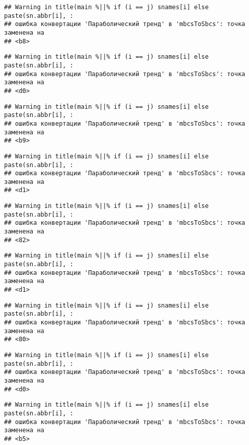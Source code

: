 \documentclass[
]{article}
\begin{document}
\begin{verbatim}
## Warning in title(main %||% if (i == j) snames[i] else paste(sn.abbr[i], :
## ошибка конвертации 'Параболический тренд' в 'mbcsToSbcs': точка заменена на
## <b8>
\end{verbatim}

\begin{verbatim}
## Warning in title(main %||% if (i == j) snames[i] else paste(sn.abbr[i], :
## ошибка конвертации 'Параболический тренд' в 'mbcsToSbcs': точка заменена на
## <d0>
\end{verbatim}

\begin{verbatim}
## Warning in title(main %||% if (i == j) snames[i] else paste(sn.abbr[i], :
## ошибка конвертации 'Параболический тренд' в 'mbcsToSbcs': точка заменена на
## <b9>
\end{verbatim}

\begin{verbatim}
## Warning in title(main %||% if (i == j) snames[i] else paste(sn.abbr[i], :
## ошибка конвертации 'Параболический тренд' в 'mbcsToSbcs': точка заменена на
## <d1>
\end{verbatim}

\begin{verbatim}
## Warning in title(main %||% if (i == j) snames[i] else paste(sn.abbr[i], :
## ошибка конвертации 'Параболический тренд' в 'mbcsToSbcs': точка заменена на
## <82>
\end{verbatim}

\begin{verbatim}
## Warning in title(main %||% if (i == j) snames[i] else paste(sn.abbr[i], :
## ошибка конвертации 'Параболический тренд' в 'mbcsToSbcs': точка заменена на
## <d1>
\end{verbatim}

\begin{verbatim}
## Warning in title(main %||% if (i == j) snames[i] else paste(sn.abbr[i], :
## ошибка конвертации 'Параболический тренд' в 'mbcsToSbcs': точка заменена на
## <80>
\end{verbatim}

\begin{verbatim}
## Warning in title(main %||% if (i == j) snames[i] else paste(sn.abbr[i], :
## ошибка конвертации 'Параболический тренд' в 'mbcsToSbcs': точка заменена на
## <d0>
\end{verbatim}

\begin{verbatim}
## Warning in title(main %||% if (i == j) snames[i] else paste(sn.abbr[i], :
## ошибка конвертации 'Параболический тренд' в 'mbcsToSbcs': точка заменена на
## <b5>
\end{verbatim}
\end{document}
